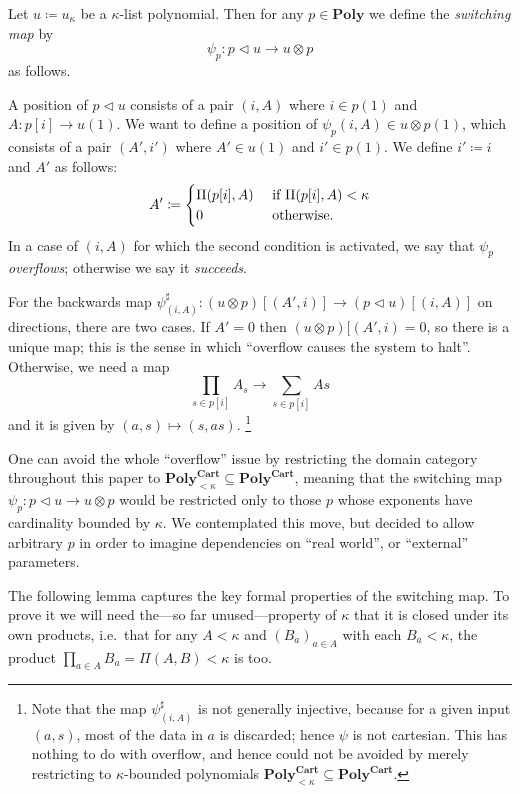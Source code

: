 \documentclass[11pt, one side, article]{memoir}
\theoremstyle{definition}
\theoremstyle{plain}
\newenvironment{definition}
  {\pushQED{\qed}\renewcommand{\qedsymbol}{$\lozenge$}\definitionx}
  {\popQED\enddefinitionx}
\renewcommand{\ss}{\subseteq}
\newcommand{\Cat}[1]{\mathbf{#1}}%
\newcommand{\tn}[1]{\textnormal{#1}}
\newcommand{\poly}{\Cat{Poly}}
\newcommand{\polycart}{\poly^{\Cat{Cart}}}
\newcommand{\0}{\textsf{0}}
\newcommand{\1}{\tn{\textsf{1}}}
\newcommand{\tri}{\mathbin{\triangleleft}}
\begin{document}
\begin{definition}[Switching map $\psi$]\label{def.switching}
Let $u\coloneqq u_\kappa$ be a $\kappa$-list polynomial. Then for any $p\in\poly$ we define the \emph{switching map} by
\[\psi_{p}\colon p\tri u\to u\otimes p\]
as follows.

A position of $p\tri u$ consists of a pair $(i,A)$ where $i\in p(1)$ and $A\colon p[i]\to u(1)$. We want to define a position of $\psi_p(i,A)\in u\otimes p(1)$, which consists of a pair $(A',i')$ where $A'\in u(1)$ and $i'\in p(1)$. We define $i'\coloneqq i$ and $A'$ as follows:
\begin{equation}\label{eqn.overflow}
  A'\coloneqq
  \begin{cases}
  	\Pi(p[i],A)&\tn{ if }\Pi(p[i],A)<\kappa\\
		0&\tn{ otherwise.}
  \end{cases}
\end{equation}
In a case of $(i,A)$ for which the second condition is activated, we say that $\psi_p$ \emph{overflows}; otherwise we say it \emph{succeeds}.

For the backwards map $\psi^\sharp_{(i,A)}\colon (u\otimes p)[(A',i)]\to(p\tri u)[(i,A)]$ on directions, there are two cases. If $A'=0$ then $(u\otimes p)[(A',i)=0$, so there is a unique map; this is the sense in which ``overflow causes the system to halt''. Otherwise, we need a map
\begin{equation}\label{eqn.not_injective}
  \prod_{s\in p[i]}A_s\to\sum_{s\in p[i]}A s
\end{equation}
and it is given by $(a,s)\mapsto(s,as)$.%
\footnote{Note that the map $\psi^\sharp_{(i,A)}$ is not generally injective, because for a given input $(a,s)$, most of the data in $a$ is discarded; hence $\psi$ is not cartesian. This has nothing to do with overflow, and hence could not be avoided by merely restricting to $\kappa$-bounded polynomials $\polycart_{<\kappa}\ss\polycart$.}
\end{definition}

One can avoid the whole ``overflow'' issue by restricting the domain category throughout this paper to $\polycart_{<\kappa}\ss\polycart$, meaning that the switching map $\psi_p\colon p\tri u\to u\otimes p$ would be restricted only to those $p$ whose exponents have cardinality bounded by $\kappa$. We contemplated this move, but decided to allow arbitrary $p$ in order to imagine dependencies on ``real world'', or ``external'' parameters.

The following lemma captures the key formal properties of the switching map. To prove it we will need the---so far unused---property of $\kappa$ that it is closed under its own products, i.e.\ that for any $A<\kappa$ and $(B_a)_{a\in A}$ with each $B_a<\kappa$, the product $\prod_{a\in A}B_a=\Pi(A,B)<\kappa$ is too.
\end{document}
